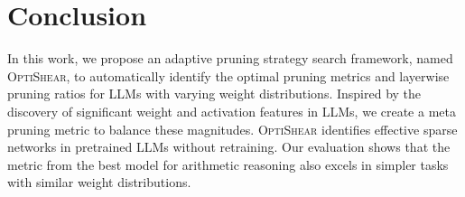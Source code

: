 \section{Conclusion}

In this work, we propose an adaptive pruning strategy search framework, named \textsc{OptiShear}, to automatically identify the optimal pruning metrics and layerwise pruning ratios for LLMs with varying weight distributions. Inspired by the discovery of significant weight and activation features in LLMs, we create a meta pruning metric to balance these magnitudes. \textsc{OptiShear} identifies effective sparse networks in pretrained LLMs without retraining. Our evaluation shows that the metric from the best model for arithmetic reasoning also excels in simpler tasks with similar weight distributions.
